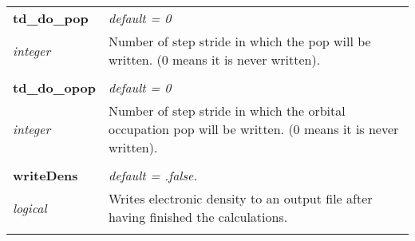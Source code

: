 \begin{Spacing}{1.0}
\begin{longtable}{ p{} p{} }
   \textbf{td\_do\_pop}
   &  \textit{default = 0}
   \\*\textit{integer}
   & Number of step stride in which the pop will be written.
   (0 means it is never written).\\* \\

   \textbf{td\_do\_opop}
   &  \textit{default = 0}
   \\*\textit{integer}
   & Number of step stride in which the orbital occupation
   pop will be written. (0 means it is never written).\\* \\

   \textbf{writeDens}
   &  \textit{default = .false. }
   \\*\textit{logical}
   & Writes electronic density to an output file after
   having finished the calculations.\\* \\

\end{longtable}
\end{Spacing}
